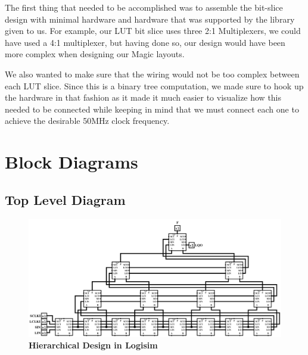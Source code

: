 \documentclass[a4paper]{article}
\begin{document}
    The first thing that needed to be accomplished was to assemble the bit-slice design with minimal hardware and hardware
    that was supported by the library given to us. For example, our LUT bit slice uses three 2:1 Multiplexers, we could have
    used a 4:1 multiplexer, but having done so, our design would have been more complex when designing our Magic layouts.

    We also wanted to make sure that the wiring would not be too complex between each LUT slice. Since this is a binary
    tree computation, we made sure to hook up the hardware in that fashion as it made it much easier to visualize how
    this needed to be connected while keeping in mind that we must connect each one to achieve the desirable 50MHz clock
    frequency.

    \newpage

\section{\textbf{Block Diagrams}}

\subsection{\textbf{Top Level Diagram}}
    \begin{figure}[H]
        \centering
        \includegraphics[width=\textwidth,height=\textheight,keepaspectratio]{../../logisim/hierarchical_top.png}
        \caption{\textbf{Hierarchical Design in Logisim}}
        \label{fig:gg}
    \end{figure}
\end{document}
